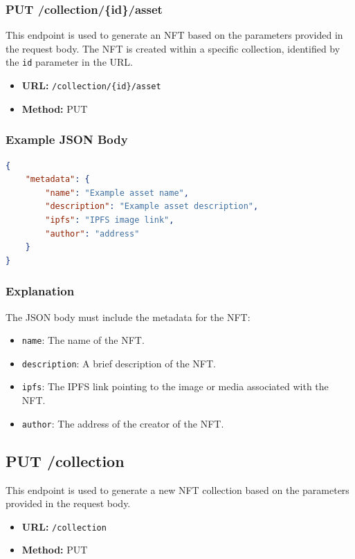 \subsubsection{PUT /collection/\{id\}/asset}
This endpoint is used to generate an NFT based on the parameters provided in the request body. The NFT is created within a specific collection, identified by the \texttt{id} parameter in the URL.

\begin{itemize}
    \item \textbf{URL:} \texttt{/collection/\{id\}/asset}
    \item \textbf{Method:} PUT
\end{itemize}

\subsubsection{Example JSON Body}
\begin{lstlisting}[language=json]
{
    "metadata": {
        "name": "Example asset name",
        "description": "Example asset description",
        "ipfs": "IPFS image link",
        "author": "address"
    }
}
\end{lstlisting}

\subsubsection{Explanation}
The JSON body must include the metadata for the NFT:
\begin{itemize}
    \item \texttt{name}: The name of the NFT.
    \item \texttt{description}: A brief description of the NFT.
    \item \texttt{ipfs}: The IPFS link pointing to the image or media associated with the NFT.
    \item \texttt{author}: The address of the creator of the NFT.
\end{itemize}

\subsection{PUT /collection}
This endpoint is used to generate a new NFT collection based on the parameters provided in the request body.

\begin{itemize}
    \item \textbf{URL:} \texttt{/collection}
    \item \textbf{Method:} PUT
\end{itemize}

